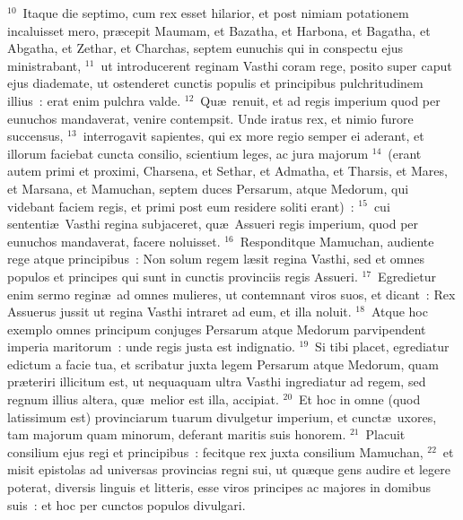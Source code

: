 ${}^{10}$~Itaque die septimo, cum rex esset hilarior, et post nimiam potationem incaluisset mero, pr\ae cepit Maumam, et Bazatha, et Harbona, et Bagatha, et Abgatha, et Zethar, et Charchas, septem eunuchis qui in conspectu ejus ministrabant,
${}^{11}$~ut introducerent reginam Vasthi coram rege, posito super caput ejus diademate, ut ostenderet cunctis populis et principibus pulchritudinem illius~: erat enim pulchra valde.
${}^{12}$~Qu\ae\ renuit, et ad regis imperium quod per eunuchos mandaverat, venire contempsit. Unde iratus rex, et nimio furore succensus,
${}^{13}$~interrogavit sapientes, qui ex more regio semper ei aderant, et illorum faciebat cuncta consilio, scientium leges, ac jura majorum
${}^{14}$~(erant autem primi et proximi, Charsena, et Sethar, et Admatha, et Tharsis, et Mares, et Marsana, et Mamuchan, septem duces Persarum, atque Medorum, qui videbant faciem regis, et primi post eum residere soliti erant)~:
${}^{15}$~cui sententi\ae\ Vasthi regina subjaceret, qu\ae\ Assueri regis imperium, quod per eunuchos mandaverat, facere noluisset.
${}^{16}$~Responditque Mamuchan, audiente rege atque principibus~: Non solum regem l\ae sit regina Vasthi, sed et omnes populos et principes qui sunt in cunctis provinciis regis Assueri.
${}^{17}$~Egredietur enim sermo regin\ae\ ad omnes mulieres, ut contemnant viros suos, et dicant~: Rex Assuerus jussit ut regina Vasthi intraret ad eum, et illa noluit.
${}^{18}$~Atque hoc exemplo omnes principum conjuges Persarum atque Medorum parvipendent imperia maritorum~: unde regis justa est indignatio.
${}^{19}$~Si tibi placet, egrediatur edictum a facie tua, et scribatur juxta legem Persarum atque Medorum, quam pr\ae teriri illicitum est, ut nequaquam ultra Vasthi ingrediatur ad regem, sed regnum illius altera, qu\ae\ melior est illa, accipiat.
${}^{20}$~Et hoc in omne (quod latissimum est) provinciarum tuarum divulgetur imperium, et cunct\ae\ uxores, tam majorum quam minorum, deferant maritis suis honorem.
${}^{21}$~Placuit consilium ejus regi et principibus~: fecitque rex juxta consilium Mamuchan,
${}^{22}$~et misit epistolas ad universas provincias regni sui, ut qu\ae que gens audire et legere poterat, diversis linguis et litteris, esse viros principes ac majores in domibus suis~: et hoc per cunctos populos divulgari.

